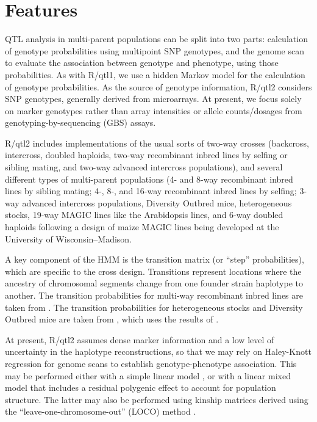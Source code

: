 \documentclass[12pt,letterpaper]{article}
\begin{document}
\clearpage
\section*{Features}

QTL analysis in multi-parent populations can be split into two parts:
calculation of genotype probabilities using multipoint SNP genotypes,
and the genome scan to evaluate the association between genotype and
phenotype, using those probabilities. As with R/qtl1, we use a hidden
Markov model \citep[HMM; see][App.\ D]{broman_sen} for the calculation
of genotype probabilities. As the source of genotype information, R/qtl2
considers SNP genotypes, generally derived from microarrays. At
present, we focus solely on marker genotypes rather than array
intensities or allele counts/dosages from genotyping-by-sequencing (GBS)
assays.

R/qtl2 includes implementations of the usual sorts of two-way crosses
(backcross, intercross, doubled haploids, two-way recombinant inbred
lines by selfing or sibling mating, and two-way advanced intercross
populations), and several different types of multi-parent populations
(4- and 8-way recombinant inbred lines by sibling mating; 4-, 8-, and
16-way recombinant inbred lines by selfing; 3-way advanced intercross
populations, Diversity Outbred mice, heterogeneous stocks, 19-way MAGIC
lines like the \citet{kover2009} Arabidopsis lines, and 6-way doubled
haploids following a design of maize MAGIC lines being developed at
the University of Wisconsin--Madison.

A key component of the HMM is the transition matrix (or ``step''
probabilities), which are specific to the cross design.
Transitions represent locations where the ancestry of chromosomal segments
change from one founder strain haplotype to another.
The transition probabilities
for multi-way recombinant inbred lines are taken from
\citet{broman2005}. The transition probabilities for heterogeneous
stocks and Diversity Outbred mice are taken from \citet{broman2012b}, which
uses the results of \citet{broman2012a}.

At present, R/qtl2 assumes dense marker information and a low level of
uncertainty in the haplotype reconstructions, so that we may rely on
Haley-Knott regression \citep{haley1992} for genome scans to establish
genotype-phenotype association. This may be performed either with a
simple linear model \citep[as in][]{haley1992}, or with a linear mixed
model \citep{yu2006, kang2008, lippert2011} that includes a residual
polygenic effect to account for population structure. The latter may
also be performed using kinship matrices derived using the
``leave-one-chromosome-out'' (LOCO) method \citep[see][]{yang2014}.
\end{document}
